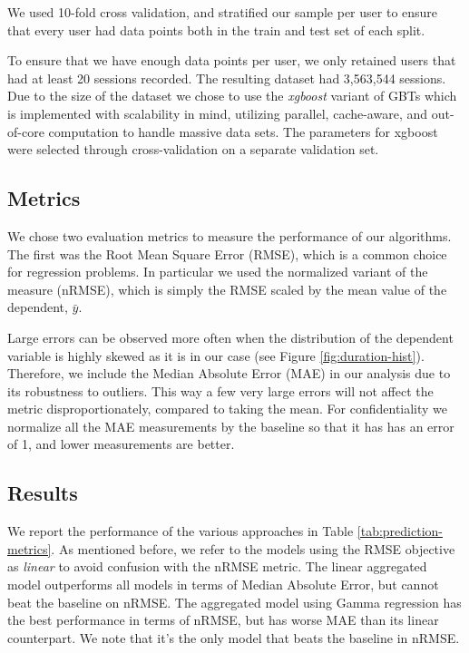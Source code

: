 We used 10-fold cross validation, and stratified our sample per user to ensure that every user
had data points both in the train and test set of each split.

To ensure that we have enough data points per user, we only retained users
that had at least 20 sessions recorded.
The resulting dataset had 3,563,544 sessions.
Due to the size of the dataset we chose to use
the \textit{xgboost} \cite{Chen2016xgboost} variant of GBTs which is
implemented with scalability in mind, utilizing parallel, cache-aware,
and out-of-core computation to handle massive data sets. The parameters
for xgboost were selected through cross-validation on a separate validation set.


\subsection{Metrics}

We chose two evaluation metrics to measure the performance of our algorithms.
The first was the Root Mean Square Error (RMSE), which is a common choice for regression problems.
In particular we used the normalized variant of the measure (nRMSE), which is simply the RMSE scaled
by the mean value of the dependent, $\bar{y}$.


Large errors can be observed more often when the distribution
of the dependent variable is highly skewed as it is in our case (see Figure \ref{fig:duration-hist}).
Therefore, we include the Median Absolute Error (MAE) in our analysis
due to its robustness to outliers. This way
a few very large errors will not affect the metric disproportionately, compared to taking the mean.
For confidentiality we normalize all the MAE measurements by the baseline so that it has has an
error of 1, and lower measurements are better.

\subsection{Results}

We report the performance of the various approaches in Table \ref{tab:prediction-metrics}.  As mentioned before, we refer to the models using the RMSE objective as \textit{linear} to avoid confusion
with the nRMSE metric. The linear aggregated model outperforms all models in terms of Median Absolute Error, but cannot beat the baseline on nRMSE.
The aggregated model using Gamma regression has the best performance in terms of nRMSE, but has worse
MAE than its linear counterpart. We note that it's the only model that beats the baseline in
nRMSE.

